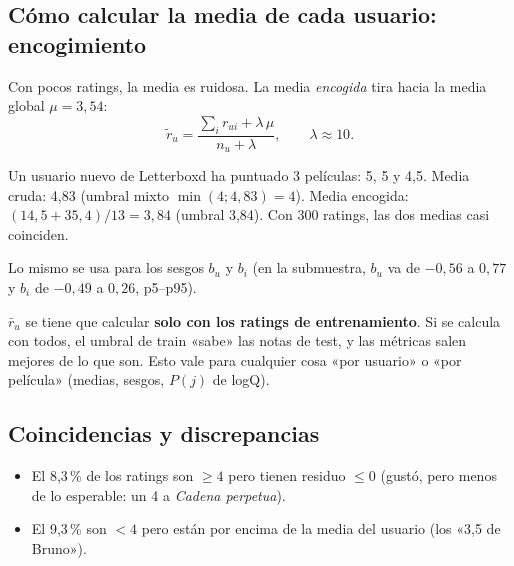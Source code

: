 \documentclass[a4paper,11pt]{article}
\begin{document}
\subsection{Cómo calcular la media de cada usuario: encogimiento}
Con pocos ratings, la media es ruidosa. La media \emph{encogida} tira hacia la media global $\mu=3{,}54$:
\[
\tilde r_u=\frac{\sum_i r_{ui}+\lambda\,\mu}{n_u+\lambda},\qquad \lambda\approx 10 .
\]
\begin{ejemplo}
Un usuario nuevo de Letterboxd ha puntuado 3 películas: 5, 5 y 4,5. Media cruda: 4,83 (umbral mixto $\min(4;4{,}83)=4$).
Media encogida: $(14{,}5+35{,}4)/13=3{,}84$ (umbral 3,84). Con 300 ratings, las dos medias casi coinciden.
\end{ejemplo}
Lo mismo se usa para los sesgos $b_u$ y $b_i$ (en la submuestra, $b_u$ va de $-0{,}56$ a $0{,}77$ y $b_i$ de $-0{,}49$ a
$0{,}26$, p5--p95).

\begin{ojo}
$\bar r_u$ se tiene que calcular \textbf{solo con los ratings de entrenamiento}. Si se calcula con todos, el umbral de
train «sabe» las notas de test, y las métricas salen mejores de lo que son. Esto vale para cualquier cosa «por
usuario» o «por película» (medias, sesgos, $P(j)$ de logQ).
\end{ojo}

\subsection{Coincidencias y discrepancias}
\begin{itemize}
  \item El 8,3\,\% de los ratings son $\ge4$ pero tienen residuo $\le 0$ (gustó, pero menos de lo esperable: un 4 a
        \emph{Cadena perpetua}).
  \item El 9,3\,\% son $<4$ pero están por encima de la media del usuario (los «3,5 de Bruno»).
\end{itemize}

\end{document}
